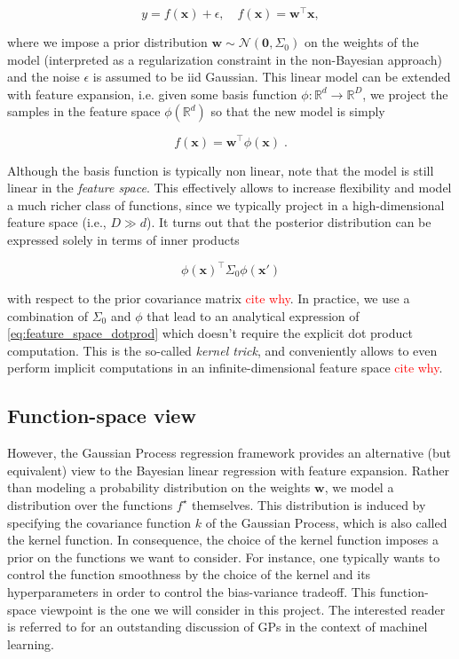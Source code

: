 \documentclass{article}
\newcommand{\vect}[1]{\boldsymbol{\mathbf{#1}}}
\newcommand{\R}{\mathbb R}
\begin{document}
\begin{equation} \label{eq:measurement_model}
    y = f(\vect x) + \epsilon, \quad f(\vect x) = \vect w^\top \vect x,
\end{equation}

where we impose a prior distribution $\vect w \sim \mathcal N(\vect 0, \Sigma_0)$ on the weights of the model (interpreted as a regularization constraint in the non-Bayesian approach) and the noise $\epsilon$ is assumed to be iid Gaussian. This linear model can be extended with feature expansion, i.e. given some basis function $\phi: \R^d \to \R^D$, we project the samples in the feature space $\phi(\R^d)$ so that the new model is simply

\begin{equation*}
    f(\vect x) = \vect w^\top \phi(\vect x) \; .
\end{equation*}

Although the basis function is typically non linear, note that the model is still linear in the \emph{feature space}. This effectively allows to increase flexibility and model a much richer class of functions, since we typically project in a high-dimensional feature space (i.e., $D \gg d$). It turns out that the posterior distribution can be expressed solely in terms of inner products 

\begin{equation} \label{eq:feature_space_dotprod}
    \phi(\vect x)^\top \Sigma_0 \phi(\vect x')
\end{equation}

with respect to the prior covariance matrix \textcolor{red}{cite why}. In practice, we use a combination of $\Sigma_0$ and $\phi$ that lead to an analytical expression of \eqref{eq:feature_space_dotprod} which doesn't require the explicit dot product computation. This is the so-called \emph{kernel trick}, and conveniently allows to even perform implicit computations in an infinite-dimensional feature space \textcolor{red}{cite why}. 


\subsection{Function-space view}

However, the Gaussian Process regression framework provides an alternative (but equivalent) view to the Bayesian linear regression with feature expansion. Rather than modeling a probability distribution on the weights $\vect w$, we model a distribution over the functions $f^\star$ themselves. This distribution is induced by specifying the covariance function $k$ of the Gaussian Process, which is also called the kernel function. In consequence, the choice of the kernel function imposes a prior on the functions we want to consider. For instance, one typically wants to control the function smoothness by the choice of the kernel and its hyperparameters in order to control the bias-variance tradeoff. This function-space viewpoint is the one we will consider in this project. The interested reader is referred to \cite{rasmussen_gaussian_2005} for an outstanding discussion of GPs in the context of machinel learning. 
\end{document}
